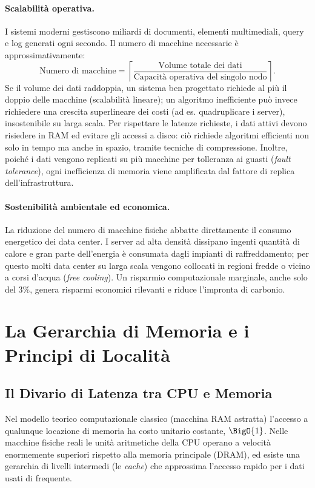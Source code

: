 \paragraph{Scalabilit\`a operativa.} I sistemi moderni gestiscono miliardi di documenti, elementi multimediali, query e log generati ogni secondo. Il numero di macchine necessarie \`e approssimativamente:
\[
\text{Numero di macchine} = \left\lceil \frac{\text{Volume totale dei dati}}{\text{Capacit\`a operativa del singolo nodo}} \right\rceil.
\]
Se il volume dei dati raddoppia, un sistema ben progettato richiede al pi\`u il doppio delle macchine (scalabilit\`a lineare); un algoritmo inefficiente pu\`o invece richiedere una crescita superlineare dei costi (ad es. quadruplicare i server), insostenibile su larga scala. Per rispettare le latenze richieste, i dati attivi devono risiedere in RAM ed evitare gli accessi a disco: ci\`o richiede algoritmi efficienti non solo in tempo ma anche in spazio, tramite tecniche di compressione. Inoltre, poich\'e i dati vengono replicati su pi\`u macchine per tolleranza ai guasti (\textit{fault tolerance}), ogni inefficienza di memoria viene amplificata dal fattore di replica dell'infrastruttura.

\paragraph{Sostenibilit\`a ambientale ed economica.} La riduzione del numero di macchine fisiche abbatte direttamente il consumo energetico dei data center. I server ad alta densit\`a dissipano ingenti quantit\`a di calore e gran parte dell'energia \`e consumata dagli impianti di raffreddamento; per questo molti data center su larga scala vengono collocati in regioni fredde o vicino a corsi d'acqua (\textit{free cooling}). Un risparmio computazionale marginale, anche solo del $3\%$, genera risparmi economici rilevanti e riduce l'impronta di carbonio.

\FloatBarrier
\section{La Gerarchia di Memoria e i Principi di Localit\`a}

\subsection{Il Divario di Latenza tra CPU e Memoria}

Nel modello teorico computazionale classico (macchina RAM astratta) l'accesso a qualunque locazione di memoria ha costo unitario costante, $\BigO{1}$. Nelle macchine fisiche reali le unit\`a aritmetiche della CPU operano a velocit\`a enormemente superiori rispetto alla memoria principale (DRAM), ed esiste una gerarchia di livelli intermedi (le \textit{cache}) che approssima l'accesso rapido per i dati usati di frequente.


